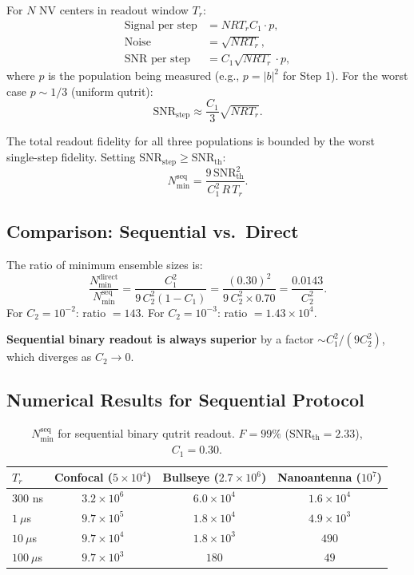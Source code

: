 \documentclass[11pt,letterpaper]{article}
\begin{document}
For $N$ NV centers in readout window $T_r$:
\begin{align}
  \text{Signal per step} &= N R T_r C_1 \cdot p, \\
  \text{Noise} &= \sqrt{N R T_r}, \\
  \text{SNR per step} &= C_1 \sqrt{N R T_r} \cdot p,
\end{align}
where $p$ is the population being measured (e.g., $p = |b|^2$ for Step 1).
For the worst case $p \sim 1/3$ (uniform qutrit):
\begin{equation}
  \text{SNR}_{\text{step}} \approx \frac{C_1}{3} \sqrt{N R T_r}.
\end{equation}

The total readout fidelity for all three populations is bounded by the
worst single-step fidelity.  Setting $\text{SNR}_{\text{step}} \geq \text{SNR}_{\text{th}}$:
\begin{equation}
  \boxed{N_{\min}^{\text{seq}} = \frac{9 \, \text{SNR}_{\text{th}}^2}{C_1^2 \, R \, T_r}.}
  \label{eq:Nmin_seq}
\end{equation}

\subsection{Comparison: Sequential vs.\ Direct}

The ratio of minimum ensemble sizes is:
\begin{equation}
  \frac{N_{\min}^{\text{direct}}}{N_{\min}^{\text{seq}}}
  = \frac{C_1^2}{9 \, C_2^2 (1 - C_1)}
  = \frac{(0.30)^2}{9 \, C_2^2 \times 0.70}
  = \frac{0.0143}{C_2^2}.
\end{equation}
For $C_2 = 10^{-2}$: ratio $= 143$.  For $C_2 = 10^{-3}$: ratio $= 1.43 \times 10^4$.

\textbf{Sequential binary readout is always superior} by a factor
$\sim C_1^2/(9 C_2^2)$, which diverges as $C_2 \to 0$.

\subsection{Numerical Results for Sequential Protocol}

\begin{table}[h]
\centering
\caption{$N_{\min}^{\text{seq}}$ for sequential binary qutrit readout.
$F = 99\%$ ($\text{SNR}_{\text{th}} = 2.33$), $C_1 = 0.30$.}
\label{tab:Nmin_seq}
\begin{tabular}{lccc}
\toprule
$T_r$ & Confocal ($5 \times 10^4$) & Bullseye ($2.7 \times 10^6$) & Nanoantenna ($10^7$) \\
\midrule
300 ns & $3.2 \times 10^6$ & $6.0 \times 10^4$ & $1.6 \times 10^4$ \\
$1~\mu$s & $9.7 \times 10^5$ & $1.8 \times 10^4$ & $4.9 \times 10^3$ \\
$10~\mu$s & $9.7 \times 10^4$ & $1.8 \times 10^3$ & $490$ \\
$100~\mu$s & $9.7 \times 10^3$ & $180$ & $49$ \\
\bottomrule
\end{tabular}
\end{table}
\end{document}
